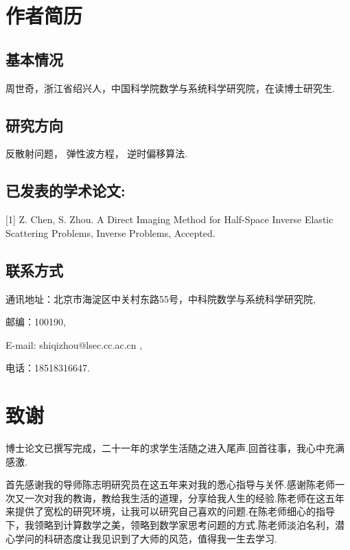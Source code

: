 \chapter{作者简历}



\section*{基本情况}


周世奇，浙江省绍兴人，中国科学院数学与系统科学研究院，在读博士研究生.

\section*{研究方向}

反散射问题， 弹性波方程， 逆时偏移算法.


\section*{已发表的学术论文:}

[1] Z. Chen, S. Zhou. A Direct Imaging Method for Half-Space Inverse
Elastic Scattering Problems, Inverse Problems, Accepted.

\section*{联系方式}

通讯地址：北京市海淀区中关村东路55号，中科院数学与系统科学研究院,

邮编：100190,

E-mail: shiqizhou@lsec.cc.ac.cn ,

电话：18518316647.

\chapter[致谢]{致\quad 谢}%
\thispagestyle{noheaderstyle}%
博士论文已撰写完成，二十一年的求学生活随之进入尾声.回首往事，我心中充满感激.%

首先感谢我的导师陈志明研究员在这五年来对我的悉心指导与关怀.感谢陈老师一次又一次对我的教诲，教给我生活的道理，分享给我人生的经验.陈老师在这五年来提供了宽松的研究环境，让我可以研究自己喜欢的问题.在陈老师细心的指导下，我领略到计算数学之美，领略到数学家思考问题的方式.陈老师淡泊名利，潜心学问的科研态度让我见识到了大师的风范，值得我一生去学习.

